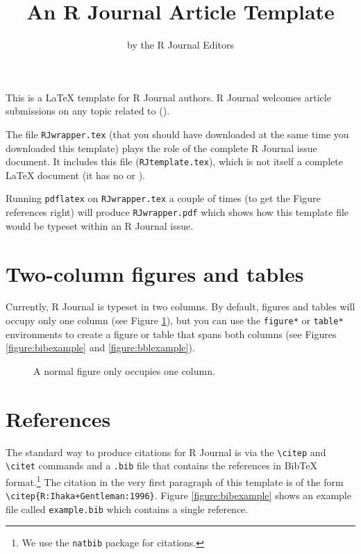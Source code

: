 \title{An R Journal Article Template}
\author{by the R Journal Editors}

\maketitle

This is a \LaTeX{} template for R Journal authors.
R Journal welcomes article submissions on any topic related to
\R{} (\citep{R:Ihaka+Gentleman:1996}).

The file {\tt RJwrapper.tex} (that you should have downloaded
at the same time you downloaded this template) plays the role
of the complete R Journal issue document.  It includes this file
({\tt RJtemplate.tex}), which is not itself a complete
\LaTeX{} document (it has no \verb|| or
\verb||).

Running {\tt pdflatex} on {\tt RJwrapper.tex} a couple of times
(to get the Figure references right) will produce
{\tt RJwrapper.pdf} which shows how this template file would be
typeset within an R Journal issue.

\section*{Two-column figures and tables}

Currently, R Journal is typeset in two columns.
By default, figures and tables will occupy only one
column (see Figure \ref{figure:onecolfig}),
but you can use the \verb|figure*| or
\verb|table*| environments to create a figure or
table that spans both columns (see Figures \ref{figure:bibexample}
and \ref{figure:bblexample}).

\begin{figure}
\vspace*{.1in}
\caption{\label{figure:onecolfig}
A normal figure only occupies one column.}
\end{figure}

\section*{References}

The standard way to produce citations for R Journal is via the
\verb|\citep| and \verb|\citet| commands
and a {\tt .bib} file that contains the
references in {\sc Bib}\TeX{} format.\footnote{We use the {\tt natbib}
package for citations.}  The citation in the very first
paragraph of this template is of the form
\verb|\citep{R:Ihaka+Gentleman:1996}|.  Figure \ref{figure:bibexample}
shows an example file called {\tt example.bib} which contains
a single reference.

